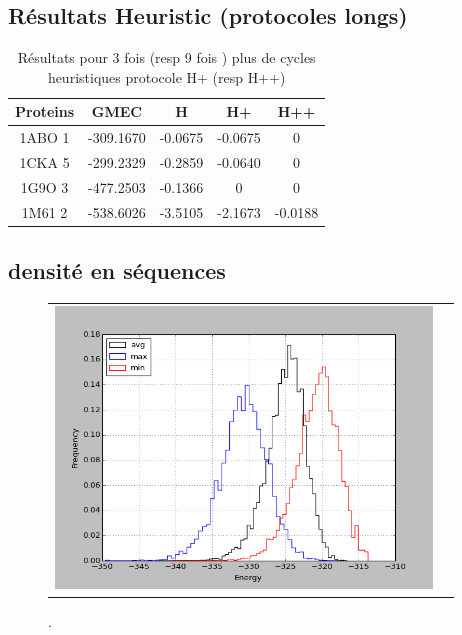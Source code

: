\documentclass[a4paper,12pt]{article}
\begin{document}
    \clearpage

   \subsection{ Résultats Heuristic (protocoles longs)}


    \begin{table}[h]
      \centering

      \begin{tabular}{|c|c|c|c|c|}

        \hline
        Proteins & GMEC & H & H+ & H++ \\
        \hline
        1ABO 1 & -309.1670 & -0.0675 & -0.0675 & 0 \\
        1CKA 5 & -299.2329 & -0.2859 & -0.0640 & 0 \\
        1G9O 3 & -477.2503 & -0.1366 & 0 & 0 \\
        1M61 2 & -538.6026 & -3.5105 & -2.1673 & -0.0188 \\
        \hline


 \end{tabular}      
 \caption{Résultats pour 3 fois (resp 9 fois ) plus de cycles heuristiques protocole H+ (resp H++)}
 \label{tab_echec2BYG__1}       
\end{table}



    \clearpage

    \clearpage

   \subsection{densité en séquences }



    \begin{figure}[h]
      \centering
      \begin{tabular}{cc} 
        \includegraphics[width=10cm]{graphe/histo1_aa_Tambiante.png} &
      \end{tabular}
      
      \caption{.}
      \label{temps_CPU}
    \end{figure}
\end{document}
